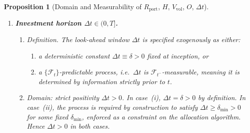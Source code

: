 \documentclass[12pt,openany]{book}
\newcommand{\calF}{\mathcal{F}}
\numberwithin{equation}{chapter}
\theoremstyle{plain}
\newtheorem{proposition}[theorem]{Proposition}
\theoremstyle{definition}
\theoremstyle{remark}
\numberwithin{equation}{chapter}
\theoremstyle{plain}
\begin{document}
\begin{proposition}[Domain and Measurability of $R_{\mathrm{port}}$,
  $H$, $V_{\mathrm{vol}}$, $O$, $\Delta t$]
\begin{enumerate}
\begin{enumerate}
      \item \emph{Handling illiquid regimes (càdlàg convention).}
        When a market quote is unavailable at time $t$, define:
        \begin{align}
          IV_t
            &:= IV_{\tau^-},
          &
          \tau
            &:= \sup\{s \leq t : C_{\mathrm{mkt}}(s) \text{ is quoted}\}.
        \end{align}
        This is the last observed value, i.e.\ a left-limit at $t$.
        By Assumption~\ref{asm:filtered-space}, the filtration
        $\{\calF_t\}$ satisfies the usual conditions
        (right-continuity and completeness), which guarantees
        the existence of right-continuous modifications of
        adapted processes.
        The càdlàg modification of $\{IV_s\}_{s \leq t}$ is
        therefore well-defined and $\calF_t$-measurable.
        The same argument applies to $\mathrm{skew}_t$ and
        $\mathrm{term}_t$.

      \item \emph{Well-definedness of $IV_t$.}
        The Black--Scholes implied volatility exists uniquely
        whenever $C_{\mathrm{mkt}} > (S_t - K e^{-r(T-t)})^+$
        (the no-arbitrage lower bound) and $C_{\mathrm{mkt}} < S_t$
        (the no-arbitrage upper bound).
        These conditions are assumed to hold in liquid regimes;
        the càdlàg fallback covers illiquid periods.
        Hence $IV_t$ is well-defined and finite for all $t$.
    \end{enumerate}

  \item \textbf{Investment horizon $\Delta t \in (0, T]$.}

    \begin{enumerate}
      \item \emph{Definition.}
        The look-ahead window $\Delta t$ is specified exogenously
        as either:
        \begin{enumerate}
          \item a deterministic constant
            $\Delta t \equiv \delta > 0$ fixed at inception, or
          \item a $\{\calF_t\}$-predictable process, i.e.\
            $\Delta t$ is $\calF_{t^-}$-measurable, meaning it is
            determined by information strictly prior to $t$.
        \end{enumerate}

      \item \emph{Domain: strict positivity $\Delta t > 0$.}
        In case~(i), $\Delta t = \delta > 0$ by definition.
        In case~(ii), the process is required by construction to
        satisfy $\Delta t \geq \delta_{\min} > 0$ for some fixed
        $\delta_{\min}$, enforced as a constraint on the
        allocation algorithm.
        Hence $\Delta t > 0$ in both cases.


\end{enumerate}
\end{enumerate}
\end{proposition}
\end{document}
